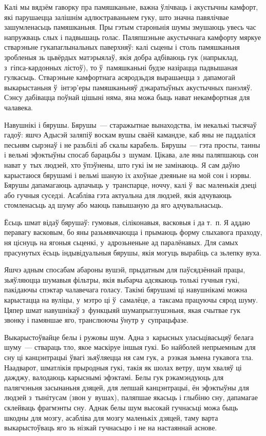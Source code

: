 Калі мы вядзём гаворку пра памяшканьне, важна ўлічваць і акустычны камфорт, які парушаецца залішнім адлюстраваньнем гуку, што значна павялічвае зашумленасьць памяшканьня. Пры гэтым староньнія шумы змушаюць увесь час напружваць слых і падвышаць голас. Паляпшэньне акустычнага камфорту мяркуе стварэньне гукапаглынальных паверхняў: калі сьцены і столь памяшканьня зробленыя зь цьвёрдых матэрыялаў, якія добра адбіваюць гук (напрыклад, з~гіпса-кардонных лістоў), то ў~памяшканьні будзе назірацца падвышаная гулкасьць. Стварэньне камфортнага асяродзьдзя вырашаецца з~дапамогай выкарыстаньня ў~інтэр'еры памяшканьняў дэкаратыўных акустычных панэляў. Сэнсу дабівацца поўнай цішыні няма, яна можа быць нават некамфортная для чалавека.

Навушнікі і бярушы. Бярушы~--- старажытнае вынаходства, ім некалькі тысячаў гадоў: яшчэ Адысэй заляпіў воскам вушы сваёй камандзе, каб яны не паддаліся песьням сырэнаў і не разьбілі аб скалы карабель. Бярушы~--- гэта просты, танны і вельмі эфэктыўны спосаб барацьбы з~шумам. Цікава, але яны паляпшаюць сон нават у~тых людзей, хто ўпэўнены, што гукі ім не замінаюць. Я сам даўно карыстаюся бярушамі і вельмі шаную іх ахоўнае дзеяньне на мой сон і нэрвы. Бярушы дапамагаюць адпачыць у~транспарце, ноччу, калі ў~вас маленькія дзеці або гучныя суседзі. Асабліва гэта актуальна для людзей, якія адчуваюць стомленасьць ад шуму або маюць павышаную да яго адчувальнасьць.

Ёсьць шмат відаў бярушаў: гумовыя, сіліконавыя, васковыя і да т.~п. Я аддаю перавагу васковым, бо яны разьмякчаюцца і прымаюць форму слыхавога праходу, ня ціснуць на ягоныя сьценкі, у~адрозьненьне ад паралёнавых. Для самых прасунутых ёсьць індывідуальныя бярушы, якія могуць вырабіць са зьлепку вуха.

Яшчэ адным спосабам абароны вушэй, прыдатным для паўсядзённай працы, зьяўляюцца шумавыя фільтры, якія выбарча адсякаюць толькі гучныя гукі, пакідаючы спэктар чалавечага голасу. Такімі бярушамі ці навушнікамі можна карыстацца на вуліцы, у~мэтро ці ў~самалёце, а~таксама працуючы сярод шуму. Цяпер шмат навушнікаў з~функцыяй шумапрыглушэньня, якая счытвае гук звонку і памяншае яго, транслюючы ўнутр у~супрацьфазе.

Выкарыстоўвайце белы і ружовы шум. Адна з~карысных уласьцівасьцяў белага шуму~--- ствараць тло, якое маскіруе іншыя гукі. Бо найболей непрыемным для сну ці канцэнтрацыі ўвагі зьяўляецца ня сам гук, а~рэзкая зьмена гукавога тла. Наадварот, шматлікія прыродныя гукі, такія як шолах ветру, шум хваляў ці дажджу, валодаюць карыснымі эфэктамі. Белы гук рэкамэндуюць для палягчэньня засынаньня дзяцей, для лепшай канцэнтрацыі, ён эфэктыўны для людзей з~тынітусам (звон у~вушах), паляпшае якасьць і глыбіню сну, дапамагае склейваць фрагмэнты сну. Аднак белы шум высокай гучнасьці можа быць шкодны для мозгу, асабліва для мозгу маленькіх дзяцей, таму варта выкарыстоўваць яго зь нізкай гучнасьцю і не на настаяннай аснове.

